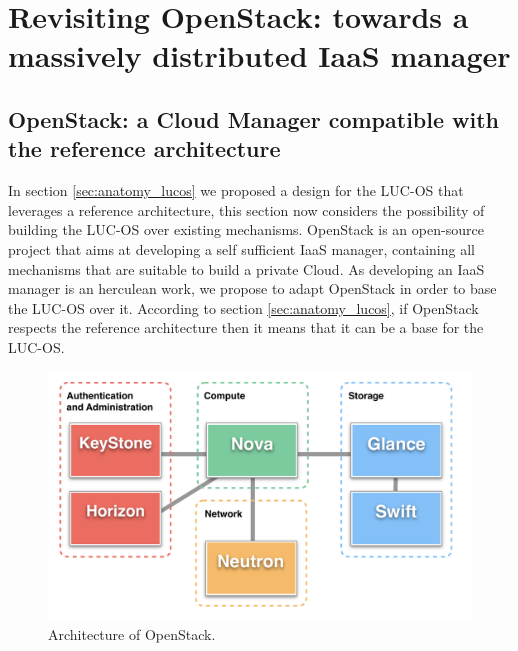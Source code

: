 \section{Revisiting OpenStack: towards a massively distributed IaaS manager}

\subsection{OpenStack: a Cloud Manager compatible with the reference 
architecture}

In section \ref{sec:anatomy_lucos} we proposed a design for the LUC-OS 
that leverages a reference architecture, this section now considers the possibility 
of building the LUC-OS over existing mechanisms. OpenStack is an open-source 
project that aims at developing a self sufficient IaaS manager, containing all 
mechanisms that are suitable to build a private Cloud. As developing an IaaS
manager is an herculean work, we propose to adapt OpenStack in order to base the
LUC-OS over it. According to section \ref{sec:anatomy_lucos}, if OpenStack 
respects the reference architecture then it means that it can be a base for the
LUC-OS.

\begin{figure}
	\centerline{
	 \includegraphics[width=0.75\linewidth]{Figures/openstack_architecture.pdf}
  }
	\caption{Architecture of OpenStack.}%
	\label{fig:openstack_architecture}%
\end{figure}

